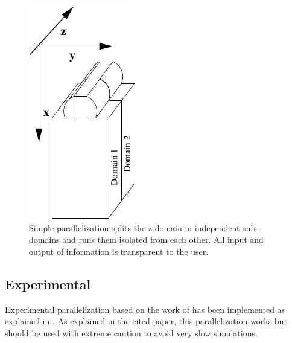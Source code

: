 \begin{figure}
\begin{center}
\includegraphics{images/poor-parallelization}
\end{center}
\caption{Simple parallelization splits the z domain in independent sub-domains and runs them isolated from each other. All input and output of information is transparent to the user.}
\label{fig:poor-parallelization}
\end{figure}

\subsection{Experimental}

Experimental parallelization based on the work of \cite{MARTINEZ-JCP08} has been implemented as explained in \cite{MARTIN-BRAGADO-NIMB15}. As explained in the cited paper, this parallelization works but should be used with extreme caution to avoid very slow simulations.
